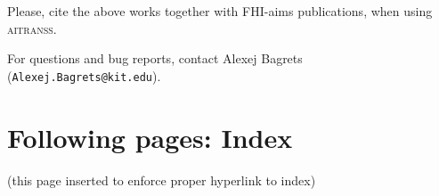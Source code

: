 \documentclass[12pt,a4paper,twoside,openany,titlepage,final]{book}
\begin{document}
Please, cite the above works together with 
FHI-aims publications, when using \textsc{aitranss}.

For questions and bug reports, contact
Alexej Bagrets (\verb,Alexej.Bagrets@kit.edu,).



\appendix


















\section*{Following pages: Index}
(this page inserted to enforce proper hyperlink to index)
\printindex
\end{document}
